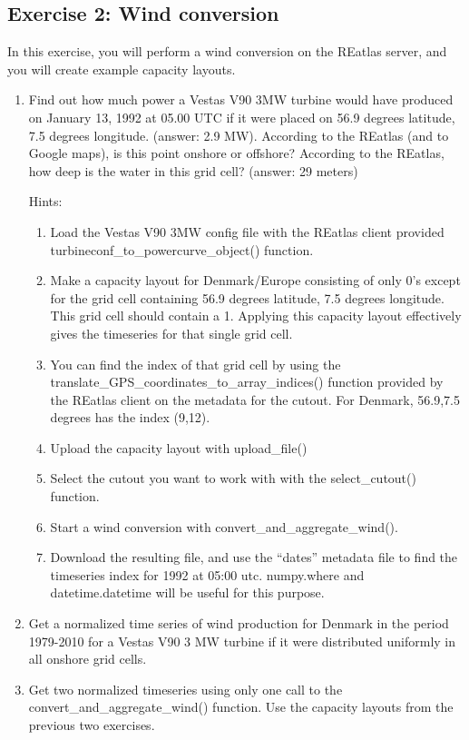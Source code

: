 \documentclass[a4paper,10pt]{article}
\begin{document}
\subsection{Exercise 2: Wind conversion}

In this exercise, you will perform a wind conversion on the REatlas server,
and you will create example capacity layouts.
     
\begin{enumerate}
     \item Find out how much power a Vestas V90 3MW turbine would have produced
           on January 13, 1992 at 05.00 UTC if it were placed
           on 56.9 degrees latitude, 7.5 degrees longitude.
           (answer: 2.9 MW). According to the REatlas (and to Google maps),
           is this point onshore or offshore?
           According to the REatlas, how deep is the water in this grid cell?
           (answer: 29 meters)

           Hints:
           \begin{enumerate}
               \item Load the Vestas V90 3MW config file with the
                    REatlas client provided turbineconf\_to\_powercurve\_object() function.
               \item Make a capacity layout for Denmark/Europe
                     consisting of only 0's except for the grid cell
                     containing 56.9 degrees latitude, 7.5 degrees longitude.
                     This grid cell should contain a 1.
                     Applying this capacity layout effectively gives
                     the timeseries for that single grid cell.

                \item You can find the index of that grid cell by using the
                     translate\_GPS\_coordinates\_to\_array\_indices() function
                     provided by the REatlas client on the metadata for the cutout.
                     For Denmark, 56.9,7.5 degrees has the index (9,12).
                \item Upload the capacity layout with upload\_file()
                \item Select the cutout you want to work with with the 
                     select\_cutout() function.
                \item Start a wind conversion with convert\_and\_aggregate\_wind().
                \item Download the resulting file, and use the ``dates'' metadata file to find the timeseries index for 1992 at 05:00 utc.
                     numpy.where and datetime.datetime will be useful for this purpose.
           \end{enumerate}
      \item Get a normalized time series of wind production for Denmark in the 
           period 1979-2010 for a Vestas V90 3 MW turbine if it were
           distributed uniformly in all onshore grid cells.
      \item Get two normalized timeseries using only one call to the
           convert\_and\_aggregate\_wind() function. Use the capacity layouts
           from the previous two exercises.


\end{enumerate}
\end{document}
